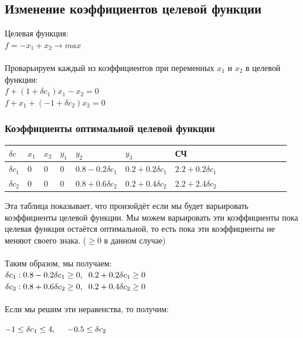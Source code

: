 \documentclass[14pt,a4paper,fleqn]{extarticle}
\begin{document}
\subsection*{Изменение коэффициентов целевой функции}
Целевая функция:\\
$f = -x_1+x_2 \longrightarrow max$\\\\
Проварьируем каждый из коэффициентов при переменных $x_1$ и $x_2$ в целевой функции:\\
$f + (1 + \delta c_1)x_1 - x_2 = 0$\\
$f + x_1 + (-1 + \delta c_2)x_2 = 0$
\newpage
\subsubsection*{Коэффициенты оптимальной целевой функции}
\begin{tabularx}{\textwidth}{V{1}p{1.2cm}V{1}p{1.2cm}V{1}p{1.2cm}V{1}p{1.2cm}V{1}p{2.4cm}V{1}p{2.4cm}V{1}p{2.445cm}V{1}}
	\hline
	\small $\delta c$ & $x_1$ & $x_2$ & $y_1$ & $y_2$ & $y_3$ & СЧ\\
	\hline
	\small $\delta c_1$ & 0 & 0 & 0 & \small $0.8-0.2\delta c_1$ & \small $0.2+0.2\delta c_1$ & \small $2.2+0.2\delta c_1$\\
	\hline
	\small $\delta c_2$ & 0 & 0 & 0 & \small $0.8+0.6\delta c_2$ & \small $0.2+0.4\delta c_2$ & \small $2.2+2.4\delta c_2$\\
	\hline
\end{tabularx}
\newline\newline
Эта таблица показывает, что произойдёт если мы будет варьировать коэффициенты целевой функции. Мы можем варьировать эти коэффициенты пока целевая функция остаётся оптимальной, то есть пока эти коэффициенты не меняют своего знака. ($\geq 0$ в данном случае)\\\\
Таким образом, мы получаем:\\
$\delta c_1: 0.8 - 0.2\delta c_1 \geq 0, \hspace*{0.2cm} 0.2+0.2\delta c_1 \geq 0$\\
$\delta c_2: 0.8+0.6\delta c_2 \geq 0, \hspace*{0.2cm} 0.2+0.4\delta c_2 \geq 0$\\\\
Если мы решим эти неравенства, то получим:
\begin{center}
	$-1 \leq \delta c_1 \leq 4, \hspace*{0.5cm} -0.5 \leq \delta c_2 $
\end{center}
\end{document}

